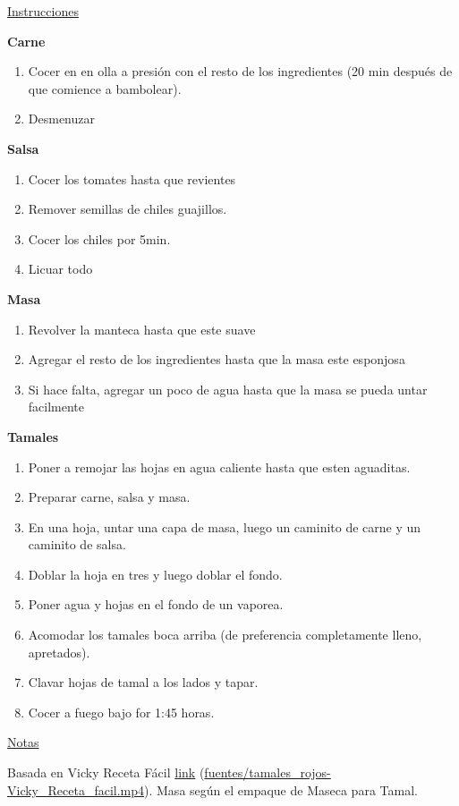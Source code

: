 \underline{Instrucciones}

\textbf{Carne}

\begin{enumerate}
\item Cocer en en olla a presión con el resto de los ingredientes (20 min después de que comience a bambolear).
\item Desmenuzar
\end{enumerate}

\textbf{Salsa}

\begin{enumerate}
\item Cocer los tomates hasta que revientes
\item Remover semillas de chiles guajillos.
\item Cocer los chiles por \Sim 5min.
\item Licuar todo
\end{enumerate}

\textbf{Masa}

\begin{enumerate}
\item Revolver la manteca hasta que este suave
\item Agregar el resto de los ingredientes hasta que la masa este esponjosa
\item Si hace falta, agregar un poco de agua hasta que la masa se pueda untar facilmente
\end{enumerate}

\textbf{Tamales}

\begin{enumerate}
\item Poner a remojar las hojas en agua caliente hasta que esten aguaditas.
\item Preparar carne, salsa y masa.
\item En una hoja, untar una capa de masa, luego un caminito de carne y un caminito de salsa.
\item Doblar la hoja en tres y luego doblar el fondo.
\item Poner agua y hojas en el fondo de un vaporea.
\item Acomodar los tamales boca arriba (de preferencia completamente lleno, apretados).
\item Clavar hojas de tamal a los lados y tapar.
\item Cocer a fuego bajo for 1:45 horas.
\end{enumerate}

\underline{Notas}

Basada en Vicky Receta Fácil \href{https://www.youtube.com/watch?v=y-_ozklQH7w}{link} (\url{fuentes/tamales_rojos-Vicky_Receta_facil.mp4}). Masa según el empaque de Maseca para Tamal.
